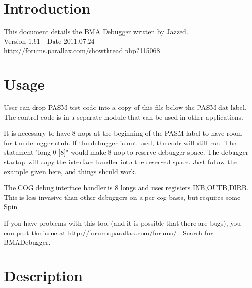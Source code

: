 \documentclass{article}
\numberwithin{equation}{section} %
\begin{document}
\renewcommand{\contentsname}{Table of Contents}
\tableofcontents
{}



\section{Introduction}

%
%
This document details the BMA Debugger written by Jazzed. \\
Version 1.91 - Date 2011.07.24 \\
http://forums.parallax.com/showthread.php?115068
 

\section{Usage}

User can drop PASM test code into a copy of this file below the PASM dat label.
The control code is in a separate module that can be used in other applications.

It is necessary to have 8 nops at the beginning of the PASM label to have room
for the debugger stub. If the debugger is not used, the code will still run.
The statement "long 0 [8]" would make 8 nop to reserve debugger space.
The debugger startup will copy the interface handler into the reserved space.
Just follow the example given here, and things should work.
  
The COG debug interface handler is 8 longs and uses registers INB,OUTB,DIRB.
This is less invasive than other debuggers on a per cog basis, but requires some Spin.

If you have problems with this tool (and it is possible that there are bugs), you
can post the issue at http://forums.parallax.com/forums/ . Search for BMADebugger.
 



\section{Description}
\end{document}
